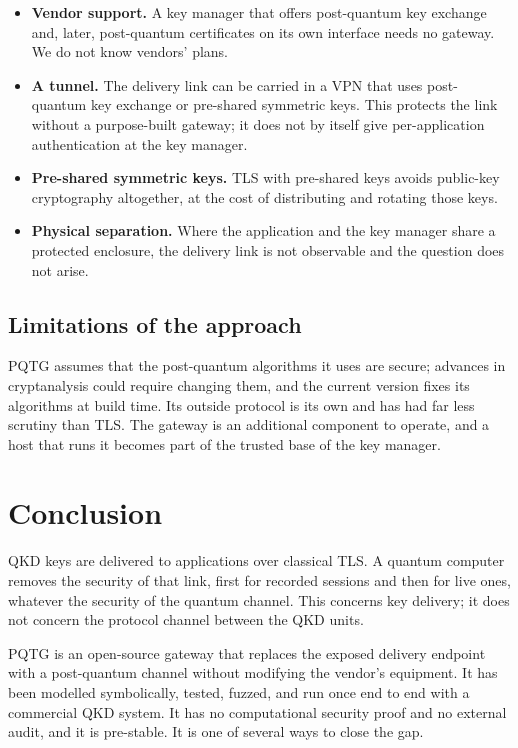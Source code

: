 \documentclass[11pt,letterpaper]{article}
\begin{document}
\begin{itemize}
    \item \textbf{Vendor support.} A key manager that offers post-quantum key exchange and, later, post-quantum certificates on its own interface needs no gateway. We do not know vendors' plans.
    \item \textbf{A tunnel.} The delivery link can be carried in a VPN that uses post-quantum key exchange or pre-shared symmetric keys. This protects the link without a purpose-built gateway; it does not by itself give per-application authentication at the key manager.
    \item \textbf{Pre-shared symmetric keys.} TLS with pre-shared keys avoids public-key cryptography altogether, at the cost of distributing and rotating those keys.
    \item \textbf{Physical separation.} Where the application and the key manager share a protected enclosure, the delivery link is not observable and the question does not arise.
\end{itemize}

\subsection{Limitations of the approach}

PQTG assumes that the post-quantum algorithms it uses are secure; advances in cryptanalysis could require changing them, and the current version fixes its algorithms at build time. Its outside protocol is its own and has had far less scrutiny than TLS. The gateway is an additional component to operate, and a host that runs it becomes part of the trusted base of the key manager.

\section{Conclusion}

QKD keys are delivered to applications over classical TLS. A quantum computer removes the security of that link, first for recorded sessions and then for live ones, whatever the security of the quantum channel. This concerns key delivery; it does not concern the protocol channel between the QKD units.

PQTG is an open-source gateway that replaces the exposed delivery endpoint with a post-quantum channel without modifying the vendor's equipment. It has been modelled symbolically, tested, fuzzed, and run once end to end with a commercial QKD system. It has no computational security proof and no external audit, and it is pre-stable. It is one of several ways to close the gap.
\end{document}
